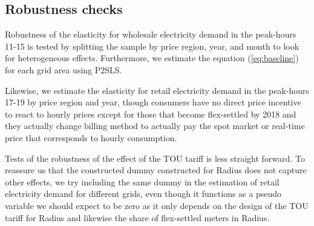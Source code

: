 \subsection{Robustness checks}
\label{subsec:e_robustness}
Robustness of the elasticity for wholesale electricity demand in the peak-hours 11-15 is tested by splitting the sample by price region, year, and month to look for heterogeneous effects. Furthermore, we estimate the equation (\ref{eq:baseline}) for each grid area using P2SLS.
\par
Likewise, we estimate the elasticity for retail electricity demand in the peak-hours 17-19 by price region and year, though consumers have no direct price incentive to react to hourly prices except for those that become flex-settled by 2018 and they actually change billing method to actually pay the spot market or real-time price that corresponds to hourly consumption.
\bigskip\par
Tests of the robustness of the effect of the TOU tariff is less straight forward. To reassure us that the constructed dummy constructed for Radius does not capture other effects, we try including the same dummy in the estimation of retail electricity demand for different grids, even though it functions as a pseudo variable we should expect to be zero as it only depends on the design of the TOU tariff for Radius and likewise the share of flex-settled meters in Radius.
